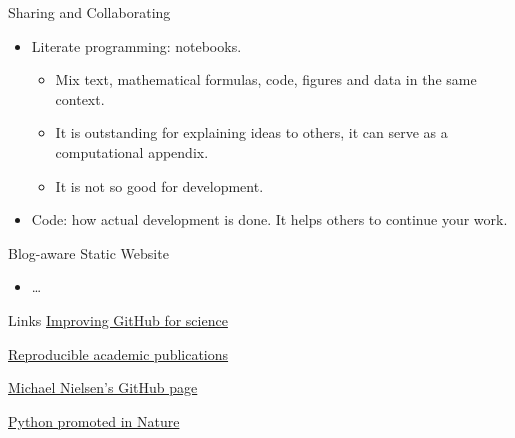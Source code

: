 \documentclass[compress,red]{beamer}\usetheme{Warsaw}\useoutertheme[subsection=false]{smoothbars}
\begin{document}
\begin{frame}{Sharing and Collaborating}
\begin{itemize}
\item Literate programming: notebooks.
\begin{itemize}
  \item Mix text, mathematical formulas, code, figures and data in the same context.
  \item It is outstanding for explaining ideas to others, it can serve as a computational appendix.
  \item It is not so good for development.
\end{itemize}
\item Code: how actual development is done. It helps others to continue your work.
\end{itemize}
\end{frame}

\begin{frame}{Blog-aware Static Website}
\begin{itemize}
\item \ldots
\end{itemize}
\end{frame}

\begin{frame}{Links}
\href{https://github.com/blog/1840-improving-github-for-science}{Improving GitHub for science}

\href{https://github.com/ipython/ipython/wiki/A-gallery-of-interesting-IPython-Notebooks\#reproducible-academic-publications}{Reproducible academic publications}

\href{https://github.com/mnielsen}{Michael Nielsen's GitHub page}

\href{http://www.nature.com/news/programming-pick-up-python-1.16833}{Python promoted in Nature}

\end{frame}
\end{document}
